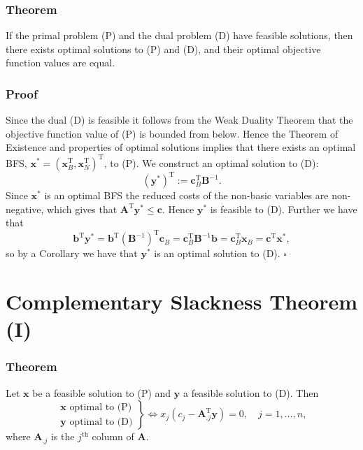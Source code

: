 \documentclass[12pt, a4paper]{article}
\begin{document}
\subsubsection*{Theorem}
If the primal problem (P) and the dual problem (D) have feasible solutions, then there exists optimal solutions to (P) and (D), and their optimal objective function values are equal.
\subsubsection*{Proof}
Since the dual (D) is feasible it follows from the Weak Duality Theorem that the objective function value of (P) is bounded from below. Hence the Theorem of Existence and properties of optimal solutions implies that there exists an optimal BFS, $\bm{x}^*=(\bm{x}_B^{\text{T}},\bm{x}_N^{\text{T}})^{\text{T}}$, to (P). We construct an optimal solution to (D):
\begin{equation*}
(\bm{y}^*)^{\text{T}} := \bm{c}_B^{\text{T}}\bm{B}^{-1}.
\end{equation*}
Since $\bm{x}^*$ is an optimal BFS the reduced costs of the non-basic variables are non-negative, which gives that $\bm{A}^{\text{T}}\bm{y}^* \leq \bm{c}$. Hence $\bm{y}^*$ is feasible to (D). Further we have that
\begin{equation*}
\bm{b}^{\text{T}}\bm{y}^* = \bm{b}^{\text{T}}(\bm{B}^{-1})^{\text{T}}\bm{c}_B = \bm{c}_B^{\text{T}}\bm{B}^{-1}\bm{b} = \bm{c}_B^{\text{T}}\bm{x}_B = \bm{c}^{\text{T}}\bm{x}^*,
\end{equation*}
so by a Corollary we have that $\bm{y}^*$ is an optimal solution to (D). $\square$

\section{Complementary Slackness Theorem (I)}
\subsubsection*{Theorem}
Let $\bm{x}$ be a feasible solution to (P) and $\bm{y}$ a feasible solution to (D). Then
\begin{equation}
\label{comp}
\left.\begin{array}{r}

  \bm{x} \text{ optimal to (P)} \\
  \bm{y} \text{ optimal to (D)}

\end{array}\right\} \Leftrightarrow x_j(c_j-\bm{A}_{.j}^{\text{T}}\bm{y})=0, \quad j=1,\dots,n,
\end{equation}
where $\bm{A}_{.j}$ is the $j^{\text{th}}$ column of $\bm{A}$.
\end{document}
